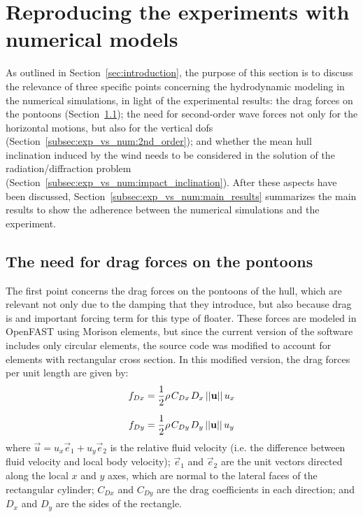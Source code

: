 \section{Reproducing the experiments with numerical models} \label{sec:exp_vs_num}
As outlined in Section~\ref{sec:introduction}, the purpose of this section is to discuss the relevance of three specific points concerning the hydrodynamic modeling in the numerical simulations, in light of the experimental results: the drag forces on the pontoons (Section~\ref{subsec:exp_vs_num:drag}); the need for second-order wave forces not only for the horizontal motions, but also for the vertical dofs (Section~\ref{subsec:exp_vs_num:2nd_order}); and whether the mean hull inclination induced by the wind needs to be considered in the solution of the radiation/diffraction problem (Section~\ref{subsec:exp_vs_num:impact_inclination}). After these aspects have been discussed, Section~\ref{subsec:exp_vs_num:main_results} summarizes the main results to show the adherence between the numerical simulations and the experiment.


\subsection{The need for drag forces on the pontoons} \label{subsec:exp_vs_num:drag}
The first point concerns the drag forces on the pontoons of the hull, which are relevant not only due to the damping that they introduce, but also because drag is and important forcing term for this type of floater. These forces are modeled in OpenFAST using Morison elements, but since the current version of the software includes only circular elements, the source code was modified to account for elements with rectangular cross section. In this modified version, the drag forces per unit length are given by:
\begin{equation}
\begin{split}
	f_{Dx} &= \frac{1}{2} \rho \mkern2mu C_{Dx} \mkern2mu D_x \,||\vec{u}|| \, u_x \\[6pt]
	f_{Dy} &= \frac{1}{2} \rho \mkern2mu C_{Dy} \mkern2mu D_y \,||\vec{u}|| \, u_y
\end{split}		
\end{equation}
%
where $\vec{u}=u_x\vec{e}_1+u_y\vec{e}_2$ is the relative fluid velocity (i.e. the difference between fluid velocity and local body velocity); $\vec{e}_1$ and $\vec{e}_2$ are the unit vectors directed along the local $x$ and $y$ axes, which are normal to the lateral faces of the rectangular cylinder; $C_{Dx}$ and $C_{Dy}$ are the drag coefficients in each direction; and $D_x$ and $D_y$ are the sides of the rectangle.

